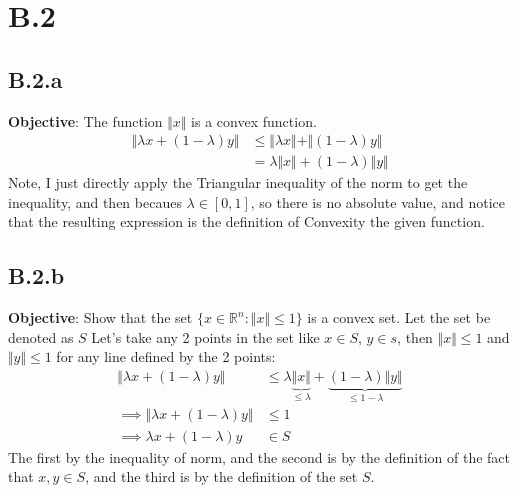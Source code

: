 \documentclass[]{article}
\begin{document}
\section*{B.2}
    \subsection*{B.2.a}\label{B.2.a}
        \textbf{Objective}: The function $\Vert x\Vert$ is a convex function. 
        \begin{align*}\tag{B.2.a.1}\label{eqn:B.2.a.1}
            \Vert \lambda x + (1 - \lambda)y \Vert 
            & \le \Vert \lambda x\Vert + \Vert (1 - \lambda) y\Vert
            \\
            & = \lambda\Vert  x \Vert +  (1 - \lambda)\Vert y\Vert
        \end{align*}
        Note, I just directly apply the Triangular inequality of the norm to get the inequality, and then becaues $\lambda\in[0, 1]$, so there is no absolute value, and notice that the resulting expression is the definition of Convexity the given function.   
    \subsection*{B.2.b}        
        \textbf{Objective}: Show that the set $\{x \in \mathbb{R}^n: \Vert x\Vert \le 1 \}$ is a convex set. Let the set be denoted as $S$ Let's take any 2 points in the set like $x \in S$,  $y \in s$, then $\Vert x\Vert \le 1$ and $\Vert y\Vert\le 1$ for any line defined by the 2 points: 
        \begin{align*}\tag{B.2.b.1}\label{eqn:B.2.b.1}
            \Vert \lambda x + (1 - \lambda)y \Vert &\le 
            \lambda \underbrace{\Vert x\Vert}_{\le \lambda} + \underbrace{(1 - \lambda)\Vert y\Vert}_{\le 1 - \lambda}
            \\
            \implies
            \Vert \lambda x + (1 - \lambda)y \Vert &\le 1
            \\
            \implies \lambda x + (1 - \lambda)y &\in S
        \end{align*}
        The first by the inequality of norm, and the second is by the definition of the fact that $x,y \in S$, and the third is by the definition of the set $S$.
\end{document}
